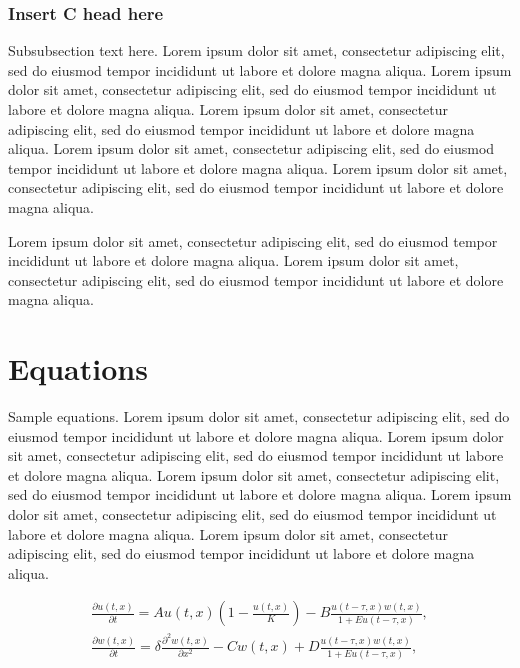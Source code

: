 \documentclass[
  journal=large,
  manuscript=article-type,
  year=2020,
  volume=37,
]{cup-journal}
\begin{document}
\subsubsection{Insert C head here}
Subsubsection text here. Lorem ipsum dolor sit amet, consectetur adipiscing elit, sed do eiusmod tempor incididunt ut labore et dolore magna aliqua. Lorem ipsum dolor sit amet, consectetur adipiscing elit, sed do eiusmod tempor incididunt ut labore et dolore magna aliqua. Lorem ipsum dolor sit amet, consectetur adipiscing elit, sed do eiusmod tempor incididunt ut labore et dolore magna aliqua. Lorem ipsum dolor sit amet, consectetur adipiscing elit, sed do eiusmod tempor incididunt ut labore et dolore magna aliqua. Lorem ipsum dolor sit amet, consectetur adipiscing elit, sed do eiusmod tempor incididunt ut labore et dolore magna aliqua. 

Lorem ipsum dolor sit amet, consectetur adipiscing elit, sed do eiusmod tempor incididunt ut labore et dolore magna aliqua. Lorem ipsum dolor sit amet, consectetur adipiscing elit, sed do eiusmod tempor incididunt ut labore et dolore magna aliqua. 

\section{Equations}

Sample equations. Lorem ipsum dolor sit amet, consectetur adipiscing elit, sed do eiusmod tempor incididunt ut labore et dolore magna aliqua. Lorem ipsum dolor sit amet, consectetur adipiscing elit, sed do eiusmod tempor incididunt ut labore et dolore magna aliqua. Lorem ipsum dolor sit amet, consectetur adipiscing elit, sed do eiusmod tempor incididunt ut labore et dolore magna aliqua. Lorem ipsum dolor sit amet, consectetur adipiscing elit, sed do eiusmod tempor incididunt ut labore et dolore magna aliqua. Lorem ipsum dolor sit amet, consectetur adipiscing elit, sed do eiusmod tempor incididunt ut labore et dolore magna aliqua. 


\begin{equation}
\begin{aligned}\label{eq:first}
\frac{\partial u(t,x)}{\partial t} = Au(t,x) \left(1-\frac{u(t,x)}{K}\right)
 -B\frac{u(t-\tau,x) w(t,x)}{1+Eu(t-\tau,x)},\\
\frac{\partial w(t,x)}{\partial t} =\delta \frac{\partial^2w(t,x)}{\partial x^2}-Cw(t,x)
+D\frac{u(t-\tau,x)w(t,x)}{1+Eu(t-\tau,x)},
\end{aligned}
\end{equation}
\end{document}
